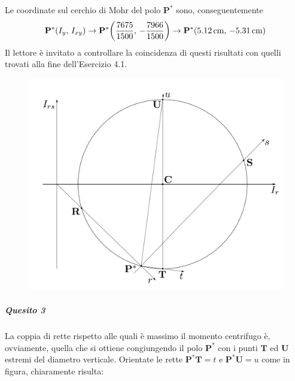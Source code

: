 Le coordinate sul cerchio di Mohr del polo $\mathbf{P}^{*}$ sono, conseguentemente 
\begin{equation*}
\mathbf{P}^{*}(I_y,\,I_{xy}) \rightarrow \mathbf{P}^{*}\biggl(\frac{7675}{1500},\,-\frac{7966}{1500}\biggr) \rightarrow \mathbf{P}^{*}(5.12\,\textup{cm},\,-5.31\,\textup{cm})
\end{equation*}
Il lettore è invitato a controllare la coincidenza di questi risultati con quelli trovati alla fine dell'Esercizio 4.1.
\renewcommand{\thefigure}{5.1~-~1}
\begin{figure}[ht]
\centering
\includegraphics[width=\textwidth]{Immagini/Parte_5/Esercizio5_1/Esercizio5_1_1.pdf}
\caption{}
\label{Esercizio5-1-1}
\end{figure}
\noindent \subparagraph{Quesito 3} La coppia di rette rispetto alle quali è massimo il momento centrifugo è, ovviamente, quella che si ottiene congiungendo il polo $\mathbf{P}^{*}$ con i punti $\mathbf{T}$ ed $\mathbf{U}$ estremi del diametro verticale. Orientate le rette $\mathbf{P}^{*}\mathbf{T}=t$ e $\mathbf{P}^{*}\mathbf{U}=u$ come in figura, chiaramente risulta:

